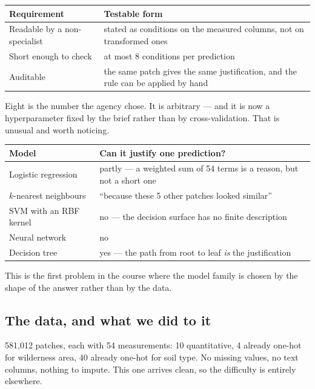\documentclass[11pt,a4paper]{article}
\begin{document}
\begin{center}
\small
\begin{tabular}{p{}p{}}
\toprule
\textbf{Requirement} & \textbf{Testable form} \\
\midrule
Readable by a non-specialist & stated as conditions on the measured columns,
                               not on transformed ones \\
Short enough to check & at most 8 conditions per prediction \\
Auditable & the same patch gives the same justification, and the rule can be
            applied by hand \\
\bottomrule
\end{tabular}
\end{center}

Eight is the number the agency chose. It is arbitrary --- and it is now a
hyperparameter fixed by the brief rather than by cross-validation. That is
unusual and worth noticing.

\begin{center}
\small
\begin{tabular}{lp{}}
\toprule
\textbf{Model} & \textbf{Can it justify one prediction?} \\
\midrule
Logistic regression & partly --- a weighted sum of 54 terms is a reason, but
                      not a short one \\
$k$-nearest neighbours & ``because these 5 other patches looked similar'' \\
SVM with an RBF kernel & no --- the decision surface has no finite
                         description \\
Neural network & no \\
Decision tree & yes --- the path from root to leaf \emph{is} the
                justification \\
\bottomrule
\end{tabular}
\end{center}

This is the first problem in the course where the model family is chosen by the
shape of the answer rather than by the data.

\subsection{The data, and what we did to it}

581{,}012 patches, each with 54 measurements: 10 quantitative, 4 already
one-hot for wilderness area, 40 already one-hot for soil type. No missing
values, no text columns, nothing to impute. This one arrives clean, so the
difficulty is entirely elsewhere.
\end{document}

